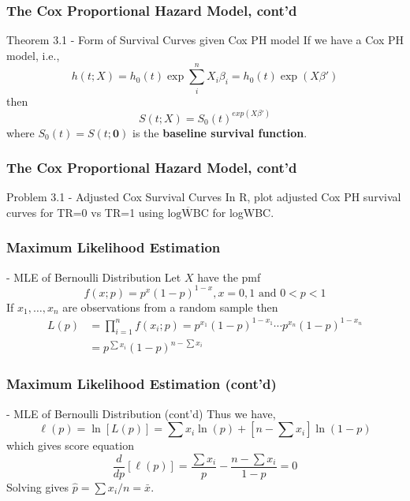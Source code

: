 \documentclass{beamer}
\theoremstyle{definition}
\begin{document}
\begin{frame}
\frametitle{The Cox Proportional Hazard Model, cont'd}
\begin{block}{Theorem 3.1 - Form of Survival Curves given Cox PH model}
If we have a Cox PH model, i.e.,
\[
h(t;X) = h_0(t)\exp{\sum_i^n X_i \beta_i} = h_0(t) \exp(X \beta')
\]
then
\[
S(t;X) = S_0(t)^{exp(X\beta')}
\]
where $S_0(t) = S(t;\mathbf{0})$ is the \textbf{baseline survival function}.
\end{block}
\end{frame}


\begin{frame}
\frametitle{The Cox Proportional Hazard Model, cont'd}
\begin{block}{Problem 3.1 - Adjusted Cox Survival Curves}
In R, plot adjusted Cox PH survival curves for TR=0 vs TR=1 using $\overline{\text{logWBC}}$ for logWBC.
\end{block}
\end{frame}

\begin{frame}
\frametitle{Maximum Likelihood Estimation}
\begin{block}{ - MLE of Bernoulli Distribution}
Let $X$ have the pmf
\[
f(x;p) =   p^x (1-p)^{1-x}, x=0,1 \text{ and } 0<p<1
\]
If $x_1,\ldots,x_n$ are observations from a random sample then
\begin{align*}
L(p) & =  \prod_{i=1}^n f(x_i;p) = p^{x_1}(1-p)^{1-x_1} \cdots p^{x_n}(1-p)^{1-x_n} \\
& = p^{\sum x_i} (1-p)^{n-\sum x_i}
\end{align*}
\end{block}
\end{frame}


\begin{frame}
\frametitle{Maximum Likelihood Estimation (cont'd)}
\begin{block}{ - MLE of Bernoulli Distribution (cont'd)}
Thus we have,
\[
\ell(p) = \ln[L(p)] = \sum x_i \ln(p) +[n-\sum x_i] \ln(1-p)
\]
which gives score equation
\[
\frac{d}{dp}[\ell(p)]= \frac{\sum x_i}{p} - \frac{n-\sum x_i}{1-p} = 0
\]
Solving gives $\hat{p} = \sum x_i/n = \bar{x}$.
\end{block}
\end{frame}
\end{document}
